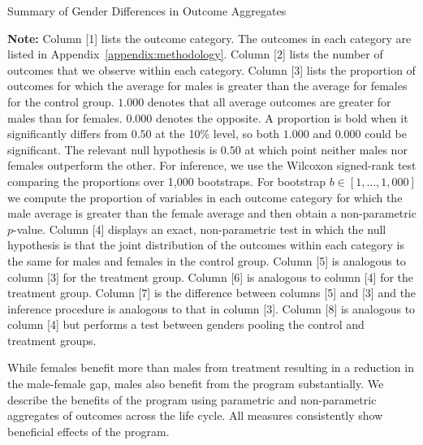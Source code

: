 \begin{sidewaystable}[!htbp] 
\centering
\footnotesize
\begin{threeparttable}
\caption{Summary of Gender Differences in Outcome Aggregates} \label{table:summary}
 \label{tab:proportion-table-ranksign}
 
 \begin{tablenotes}
 \footnotesize
\item \textbf{Note:} Column [1] lists the outcome category. The outcomes in each category are listed in Appendix~\ref{appendix:methodology}. Column [2] lists the number of outcomes that we observe within each category. Column [3] lists the proportion of outcomes for which the average for males is greater than the average for females for the control group. $1.000$ denotes that all average outcomes are greater for males than for females. $0.000$ denotes the opposite. A proportion is bold when it significantly differs from $0.50$ at the 10\% level, so both $1.000$ and $0.000$ could be significant. The relevant null hypothesis is $0.50$ at which point neither males nor females outperform the other. For inference, we use the Wilcoxon signed-rank test comparing the proportions over 1,000 bootstraps. For bootstrap $b \in [1, \ldots, 1,000]$ we compute the proportion of variables in each outcome category for which the male average is greater than the female average and then obtain a non-parametric $p$-value. Column [4] displays an exact, non-parametric test in which the null hypothesis is that the joint distribution of the outcomes within each category is the same for males and females in the control group. Column [5] is analogous to column [3] for the treatment group. Column [6] is analogous to column [4] for the treatment group. Column [7] is the difference between columns [5] and [3] and the inference procedure is analogous to that in column [3]. Column [8] is analogous to column [4] but performs a test between genders pooling the control and treatment groups.
\end{tablenotes}
\end{threeparttable}
\end{sidewaystable}

While females benefit more than males from treatment resulting in a reduction in the male-female gap, males also benefit from the program substantially. We describe the benefits of the program using parametric and non-parametric aggregates of outcomes across the life cycle. All measures consistently show beneficial effects of the program.

